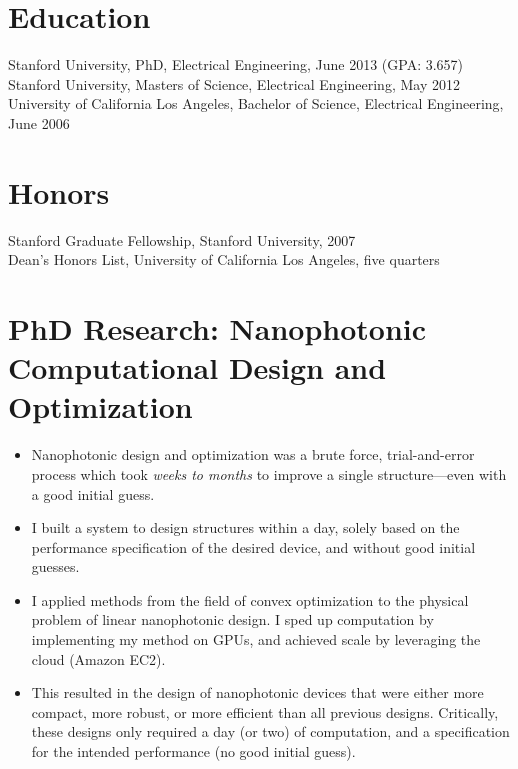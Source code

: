 \documentclass{res}
\begin{document}
 

\address{\texttt{jesselu@stanford.edu} \\ 66 Newell Rd. Apt. O \\ East Palo Alto, CA \\ (408) 568-9356}
                                  
\begin{resume}

\section{Education}          
    Stanford University, PhD, Electrical Engineering, June 2013 (GPA: 3.657)\\
    Stanford University, Masters of Science, Electrical Engineering, May 2012 \\
    University of California Los Angeles, Bachelor of Science, Electrical Engineering, June 2006

\section{Honors}
    Stanford Graduate Fellowship, Stanford University, 2007 \\
    Dean's Honors List, University of California Los Angeles, five quarters

\section{PhD Research: Nanophotonic Computational Design and Optimization}
\begin{itemize}
\item Nanophotonic design and optimization was 
    a brute force, trial-and-error process
    which took \emph{weeks to months} to improve a single structure---even with 
    a good initial guess.
\item I built a system to design structures within a day,
    solely based on the performance specification of the desired device,
    and without good initial guesses.
\item I applied methods from the field of convex optimization 
    to the physical problem of linear nanophotonic design. 
    I sped up computation by implementing my method on GPUs,
    and achieved scale by leveraging the cloud (Amazon EC2).
\item This resulted in the design 
    of nanophotonic devices that were either
    more compact, more robust, or more efficient 
    than all previous designs.
    Critically, these designs only required a day (or two) of computation,
    and a specification for the intended performance (no good initial guess).
    \end{itemize}


\end{resume}
\end{document}
